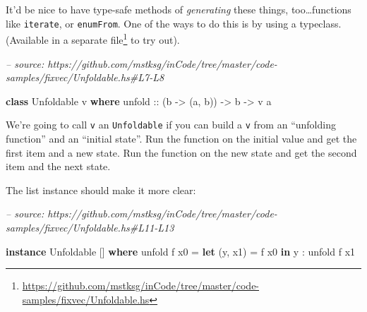 \documentclass[]{article}
\newenvironment{Shaded}{}{}
\newcommand{\CommentTok}[1]{\textcolor[rgb]{0.38,0.63,0.69}{\textit{#1}}}
\newcommand{\DataTypeTok}[1]{\textcolor[rgb]{0.56,0.13,0.00}{#1}}
\newcommand{\DecValTok}[1]{\textcolor[rgb]{0.25,0.63,0.44}{#1}}
\newcommand{\FunctionTok}[1]{\textcolor[rgb]{0.02,0.16,0.49}{#1}}
\newcommand{\KeywordTok}[1]{\textcolor[rgb]{0.00,0.44,0.13}{\textbf{#1}}}
\newcommand{\NormalTok}[1]{#1}
\newcommand{\OtherTok}[1]{\textcolor[rgb]{0.00,0.44,0.13}{#1}}
\renewcommand{\href}[2]{#2\footnote{\url{#1}}}
\begin{document}
It'd be nice to have type-safe methods of \emph{generating} these things,
too\ldots{}functions like \texttt{iterate}, or \texttt{enumFrom}. One of the
ways to do this is by using a typeclass. (Available in a
\href{https://github.com/mstksg/inCode/tree/master/code-samples/fixvec/Unfoldable.hs}{separate
file} to try out).

\begin{Shaded}
\begin{Highlighting}[]
\CommentTok{-- source: https://github.com/mstksg/inCode/tree/master/code-samples/fixvec/Unfoldable.hs#L7-L8}

\KeywordTok{class} \DataTypeTok{Unfoldable}\NormalTok{ v }\KeywordTok{where}
\OtherTok{    unfold ::}\NormalTok{ (b }\OtherTok{->}\NormalTok{ (a, b)) }\OtherTok{->}\NormalTok{ b }\OtherTok{->}\NormalTok{ v a}
\end{Highlighting}
\end{Shaded}

We're going to call \texttt{v} an \texttt{Unfoldable} if you can build a
\texttt{v} from an ``unfolding function'' and an ``initial state''. Run the
function on the initial value and get the first item and a new state. Run the
function on the new state and get the second item and the next state.

The list instance should make it more clear:

\begin{Shaded}
\begin{Highlighting}[]
\CommentTok{-- source: https://github.com/mstksg/inCode/tree/master/code-samples/fixvec/Unfoldable.hs#L11-L13}

\KeywordTok{instance} \DataTypeTok{Unfoldable}\NormalTok{ [] }\KeywordTok{where}
\NormalTok{    unfold f x0 }\FunctionTok{=} \KeywordTok{let}\NormalTok{ (y, x1) }\FunctionTok{=}\NormalTok{ f x0}
                  \KeywordTok{in}\NormalTok{  y }\FunctionTok{:}\NormalTok{ unfold f x1}
\end{Highlighting}
\end{Shaded}

\begin{Shaded}
\end{Shaded}
\end{document}
